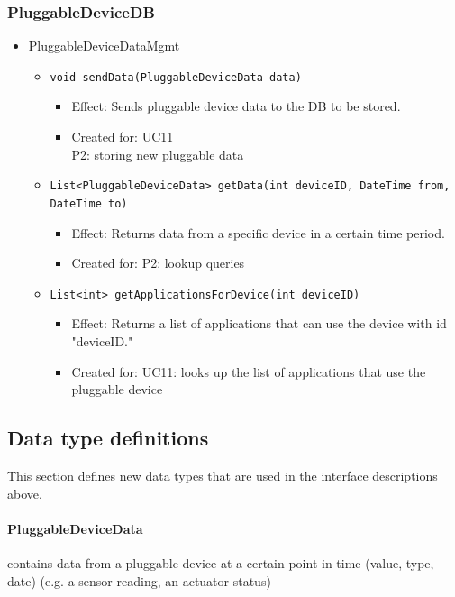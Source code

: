     \subsubsection{PluggableDeviceDB}
        \begin{itemize}
            \item PluggableDeviceDataMgmt
            \begin{itemize}
                \item \texttt{void sendData(PluggableDeviceData data)}
                \begin{itemize}
                    \item Effect: Sends pluggable device data to the DB to be stored.
                    \item Created for: UC11 \\
                          P2: storing new pluggable data
                \end{itemize}
                \item \texttt{List<PluggableDeviceData> getData(int deviceID, DateTime from, DateTime to)}
                \begin{itemize}
                    \item Effect: Returns data from a specific device in a certain time period.
                    \item Created for: P2: lookup queries
                \end{itemize}
                \item \texttt{List<int> getApplicationsForDevice(int deviceID)}
                \begin{itemize}
                    \item Effect: Returns a list of applications that can use the device with id "deviceID."
                    \item Created for: UC11: looks up the list of applications that use the pluggable device
                \end{itemize}
            \end{itemize}
        \end{itemize}


\subsection{Data type definitions}
    This section defines new data types that are used in the interface descriptions above.

    \paragraph{PluggableDeviceData}
               contains data from a pluggable device at a certain point in time
               (value, type, date) (e.g. a sensor reading, an actuator status)
